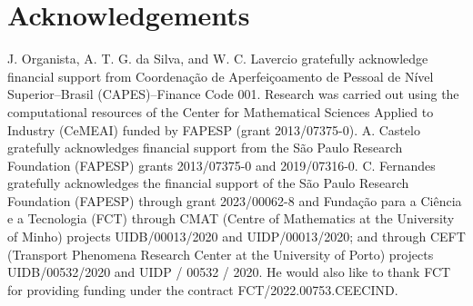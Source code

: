 \documentclass[preprint, 12pt]{elsarticle}
\begin{document}
\section*{Acknowledgements}
J. Organista, A. T. G. da Silva, and W. C. Lavercio gratefully acknowledge
financial support from Coordenação de Aperfeiçoamento de Pessoal de Nível
Superior–Brasil (CAPES)–Finance Code 001. Research was carried out using the
computational resources of the Center for Mathematical Sciences Applied to
Industry (CeMEAI) funded by FAPESP (grant 2013/07375-0). A. Castelo gratefully
acknowledges financial support from the São Paulo Research Foundation (FAPESP)
grants 2013/07375-0 and 2019/07316-0. C. Fernandes gratefully acknowledges the
financial support of the São Paulo Research Foundation (FAPESP) through grant
2023/00062-8 and Fundação para a Ciência e a Tecnologia (FCT) through CMAT
(Centre of Mathematics at the University of Minho) projects UIDB/00013/2020 and
UIDP/00013/2020; and through CEFT (Transport Phenomena Research Center at the
University of Porto) projects UIDB/00532/2020 and UIDP / 00532 / 2020. He would
also like to thank FCT for providing funding under the contract
FCT/2022.00753.CEECIND.

% 

% 


\end{document}
